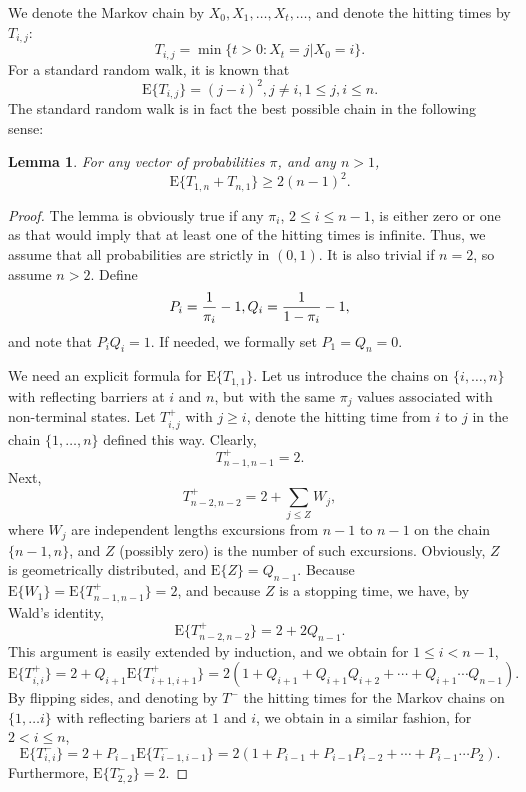 \documentclass [letterpaper] {patmorin}
\newtheorem{lemma}{Lemma}%
\newcommand{\EXP}{\mathrm{E}}
\newcommand{\PROB}{\Pr}
\begin{document}
We denote the Markov chain by $X_0, X_1, \ldots, X_t , \ldots$,
and denote the hitting times by $T_{i,j}$:
\[
T_{i,j} = \min \{ t > 0: X_t = j | X_0 = i \}.
\]
For a standard random walk, it is known that
\[
\EXP \{ T_{i,j} \} = (j-i)^2, j \not= i, 1 \le j,i \le n.
\]
The standard random walk is in fact the best possible chain in the following sense:

\begin{lemma}\label{lemma:backandforth}
For any vector of probabilities $\pi$, and any $n > 1$,
\[
\EXP \{ T_{1,n} + T_{n,1} \} \ge 2 (n-1)^2.
\]
\end{lemma}

\begin{proof}
The lemma is obviously true if any $\pi_i$, $2 \le i \le n-1$, is either
zero or one as that would imply that at least one of the hitting times is
infinite. Thus, we assume that all probabilities are strictly in $(0,1)$.
It is also trivial if $n=2$, so assume $n > 2$.
Define
\[
P_i = {1 \over \pi_i } - 1, Q_i = {1 \over 1-\pi_i} - 1,
\]
and note that $P_i Q_i = 1$.
If needed, we formally set $P_1 = Q_n = 0$.
%  

We need an explicit formula for $\EXP \{ T_{1,1} \}$.
Let us introduce the chains on $\{ i, \ldots , n \}$ with
reflecting barriers at $i$ and $n$, but with the same $\pi_j$ values
associated with non-terminal states. 
Let $T^+_{i,j}$ with $j \ge i$, denote the hitting time from $i$ to $j$ in the chain $\{1,\ldots,n\}$ defined this way.
Clearly,
\[
T^+_{n-1, n-1} = 2.
\]
Next,
\[
T^+_{n-2, n-2 } = 2 + \sum_{j \le Z} W_j,
\]
where $W_j$ are independent lengths excursions from $n-1$ to  $n-1$
on the chain $\{ n-1, n \}$, and $Z$ (possibly zero) is the number of such excursions.
Obviously, $Z$ is geometrically distributed, and $\EXP \{ Z \} = Q_{n-1}$.
Because $\EXP \{ W_1 \} = \EXP \{ T^+_{n-1, n-1} \} = 2$,
and because $Z$ is a stopping time, 
we have, by Wald's identity,
\[
\EXP \{ T^+_{n-2, n-2} \} = 2 + 2 Q_{n-1}.
\]
This argument is easily extended by induction, and we obtain for $1 \le i < n-1$,
\[
\EXP \{ T^+_{i, i} \}  = 2 + Q_{i+1} \EXP \{ T^+_{i+1, i+1} \}
  = 2 \left( 1 + Q_{i+1} + Q_{i+1} Q_{i+2} + \cdots + Q_{i+1} \cdots Q_{n-1} \right).
\]
By flipping sides, and denoting by $T^-$ the hitting times for
the Markov chains on $\{ 1, \ldots i \}$
with reflecting bariers at $1$ and $i$, we obtain in a similar fashion,
for $2 < i \le n$,
\[
\EXP \{ T^-_{i, i} \}  = 2 + P_{i-1} \EXP \{ T^-_{i-1, i-1} \}
  = 2 \left( 1 + P_{i-1} + P_{i-1} P_{i-2} + \cdots + P_{i-1} \cdots P_{2} \right).
\]
Furthermore, $\EXP \{ T^-_{2, 2} \}  =2$.


\end{proof}
\end{document}
